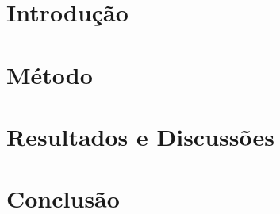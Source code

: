 \chapter{Introdução}
\label{chap:intro}

\lipsum


\chapter{Método}
\chapter{Resultados e Discussões}
\chapter{Conclusão}
